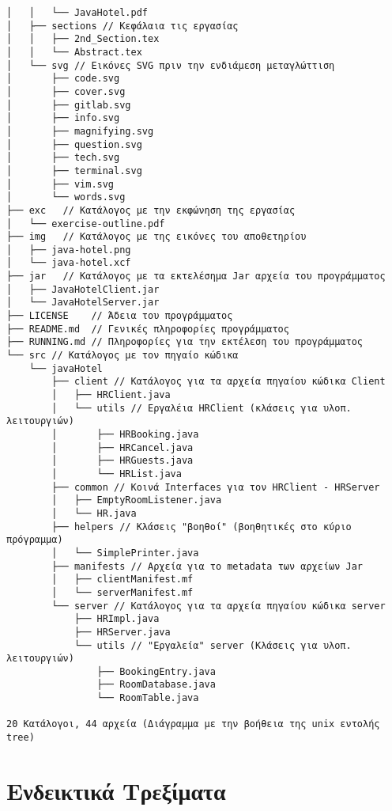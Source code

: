 {\begin{verbatim}
│   │   └── JavaHotel.pdf
│   ├── sections // Κεφάλαια τις εργασίας
│   │   ├── 2nd_Section.tex
│   │   └── Abstract.tex
│   └── svg // Εικόνες SVG πριν την ενδιάμεση μεταγλώττιση
│       ├── code.svg
│       ├── cover.svg
│       ├── gitlab.svg
│       ├── info.svg
│       ├── magnifying.svg
│       ├── question.svg
│       ├── tech.svg
│       ├── terminal.svg
│       ├── vim.svg
│       └── words.svg
├── exc   // Κατάλογος με την εκφώνηση της εργασίας
│   └── exercise-outline.pdf
├── img   // Κατάλογος με της εικόνες του αποθετηρίου
│   ├── java-hotel.png
│   └── java-hotel.xcf
├── jar   // Κατάλογος με τα εκτελέσημα Jar αρχεία του προγράμματος
│   ├── JavaHotelClient.jar
│   └── JavaHotelServer.jar
├── LICENSE    // Άδεια του προγράμματος
├── README.md  // Γενικές πληροφορίες προγράμματος
├── RUNNING.md // Πληροφορίες για την εκτέλεση του προγράμματος
└── src // Κατάλογος με τον πηγαίο κώδικα
    └── javaHotel
        ├── client // Κατάλογος για τα αρχεία πηγαίου κώδικα Client
        │   ├── HRClient.java
        │   └── utils // Εργαλέια HRClient (κλάσεις για υλοπ. λειτουργιών)
        │       ├── HRBooking.java
        │       ├── HRCancel.java
        │       ├── HRGuests.java
        │       └── HRList.java
        ├── common // Κοινά Interfaces για τον HRClient - HRServer
        │   ├── EmptyRoomListener.java
        │   └── HR.java
        ├── helpers // Κλάσεις "βοηθοί" (βοηθητικές στο κύριο πρόγραμμα)
        │   └── SimplePrinter.java
        ├── manifests // Αρχεία για το metadata των αρχείων Jar
        │   ├── clientManifest.mf
        │   └── serverManifest.mf
        └── server // Κατάλογος για τα αρχεία πηγαίου κώδικα server
            ├── HRImpl.java
            ├── HRServer.java
            └── utils // "Εργαλεία" server (Κλάσεις για υλοπ. λειτουργιών)
                ├── BookingEntry.java
                ├── RoomDatabase.java
                └── RoomTable.java

20 Κατάλογοι, 44 αρχεία (Διάγραμμα με την βοήθεια της unix εντολής tree)
\end{verbatim}
}
\section{Ενδεικτικά Τρεξίματα}
